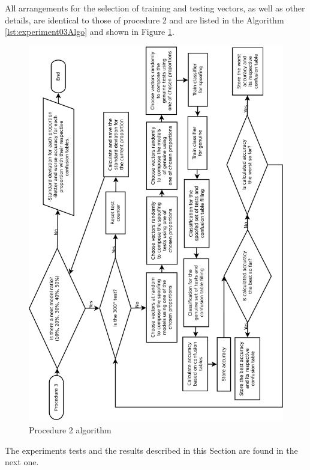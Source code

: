 			\par All arrangements for the selection of training and testing vectors, as well as other details, are identical to those of procedure 2 and are listed in the Algorithm \ref{lst:experiment03Algo} and shown in Figure \ref{fig:experiment03Algo}. 
			
			
			
			\begin{figure}[H]
				\centering
				\includegraphics[angle=-90,width=1\linewidth]{images/AlgoProcedure03.pdf}
				\caption{Procedure 2 algorithm}
				\label{fig:experiment03Algo}
			\end{figure}
			
			\par The experiments tests and the results described in this Section are found in the next one.